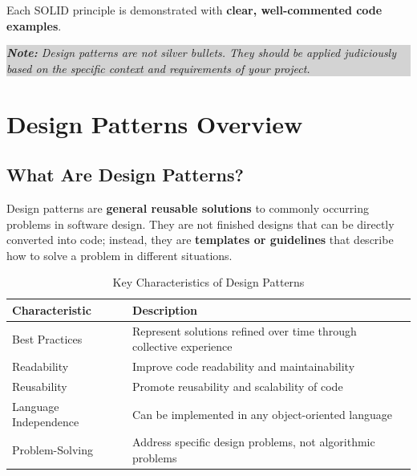 \documentclass[12pt,a4paper]{article}
\newcommand{\important}[1]{\textbf{\textcolor{accent}{#1}}}
\newcommand{\note}[1]{\par\noindent\colorbox{lightgray}{\parbox{\linewidth}{\textit{\textbf{Note:} #1}}}\vspace{0.5em}}
\begin{document}
Each SOLID principle is demonstrated with \important{clear, well-commented code examples}.

\note{Design patterns are not silver bullets. They should be applied judiciously based on the specific context and requirements of your project.}

\section{Design Patterns Overview}
\label{sec:design-patterns-overview}

\subsection{What Are Design Patterns?}

Design patterns are \important{general reusable solutions} to commonly occurring problems in software design. They are not finished designs that can be directly converted into code; instead, they are \important{templates or guidelines} that describe how to solve a problem in different situations.

\vspace{0.5em}

\begin{table}[h]
    \centering
    \begin{tabular}{|>{\raggedright\arraybackslash}p{}|>{\raggedright\arraybackslash}p{}|}
        \hline
        \rowcolor{lightgray}
        \textbf{Characteristic} & \textbf{Description} \\
        \hline
        Best Practices & Represent solutions refined over time through collective experience \\
        \hline
        Readability & Improve code readability and maintainability \\
        \hline
        Reusability & Promote reusability and scalability of code \\
        \hline
        Language Independence & Can be implemented in any object-oriented language \\
        \hline
        Problem-Solving & Address specific design problems, not algorithmic problems \\
        \hline
    \end{tabular}
    \caption{Key Characteristics of Design Patterns}
    \label{tab:pattern-characteristics}
\end{table}
\end{document}
